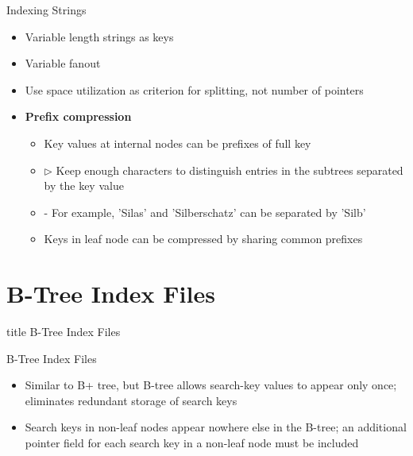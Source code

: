 \documentclass[aspectratio=169, xcolor=dvipsnames]{beamer}
\begin{document}
\begin{frame}{Indexing Strings}
    \begin{itemize}[<+->]
        \item Variable length strings as keys
        \item Variable fanout
        \item Use space utilization as criterion for splitting, not number of pointers
        \item \textbf{Prefix compression}
        \begin{itemize}[<+->]
            \item Key values at internal nodes can be prefixes of full key
            \item $\triangleright$ Keep enough characters to distinguish entries in the subtrees separated by the key value
            \item - For example, 'Silas' and 'Silberschatz' can be separated by 'Silb'
            \item Keys in leaf node can be compressed by sharing common prefixes
        \end{itemize}
    \end{itemize}
\end{frame}

\section{B-Tree Index Files}
\begin{frame}
  \vfill
  \centering
  \begin{beamercolorbox}[sep=8pt,center,shadow=true,rounded=true]{title}
    B-Tree Index Files\par%
  \end{beamercolorbox}
  \vfill
\end{frame}

\begin{frame}{B-Tree Index Files}
    \begin{itemize}[<+->]
        \item Similar to B+ tree, but B-tree allows search-key values to appear only once; eliminates redundant storage of search keys
        \item Search keys in non-leaf nodes appear nowhere else in the B-tree; an additional pointer field for each search key in a non-leaf node must be included
    \end{itemize}
\end{frame}
\end{document}
